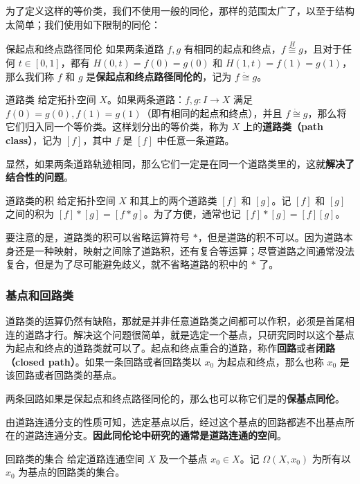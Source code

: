 为了定义这样的等价类，我们不使用一般的同伦，那样的范围太广了，以至于结构太简单；我们使用如下限制的同伦：

\begin{definition}{保起点和终点路径同伦}\label{def_HomT3_2}
如果两条道路 $f, g$ 有相同的起点和终点，$f\overset{H}{\cong}g$，且对于任何 $t\in [0, 1]$，都有 $H(0, t)=f(0)=g(0)$ 和 $H(1, t)=f(1)=g(1)$，那么我们称 $f$ 和 $g$ 是\textbf{保起点和终点路径同伦的}，记为 $f\dot{\cong}g$。
\end{definition}

\begin{definition}{道路类}
给定拓扑空间 $X$。如果两条道路：$f, g:I\rightarrow X$ 满足 $f(0)=g(0), f(1)=g(1)$（即有相同的起点和终点），并且 $f\dot{\cong}g$，那么将它们归入同一个等价类。这样划分出的等价类，称为 $X$ 上的\textbf{道路类（path class）}，记为 $[f]$，其中 $f$ 是 $[f]$ 中任意一条道路。
\end{definition}

显然，如果两条道路轨迹相同，那么它们一定是在同一个道路类里的，这就\textbf{解决了结合性的问题}。

\begin{definition}{道路类的积}
给定拓扑空间 $X$ 和其上的两个道路类 $[f]$ 和 $[g]$。记 $[f]$ 和 $[g]$ 之间的积为 $[f]*[g]=[f*g]$。为了方便，通常也记 $[f]*[g]=[f][g]$。
\end{definition}

要注意的是，道路类的积可以省略运算符号 $*$，但是道路的积不可以。因为道路本身还是一种映射，映射之间除了道路积，还有复合等运算；尽管道路之间通常没法复合，但是为了尽可能避免歧义，就不省略道路的积中的 $*$ 了。

\subsubsection{基点和回路类}

道路类的运算仍然有缺陷，那就是并非任意道路类之间都可以作积，必须是首尾相连的道路才行。解决这个问题很简单，就是选定一个基点，只研究同时以这个基点为起点和终点的道路类就可以了。起点和终点重合的道路，称作\textbf{回路}或者\textbf{闭路（closed path）}。如果一条回路或者回路类以 $x_0$ 为起点和终点，那么也称 $x_0$ 是该回路或者回路类的基点。

两条回路如果是保起点和终点路径同伦的，那么也可以称它们是的\textbf{保基点同伦}。

由道路连通分支的性质可知，选定基点以后，经过这个基点的回路都逃不出基点所在的道路连通分支。\textbf{因此同伦论中研究的通常是道路连通的空间}。

\begin{definition}{回路类的集合}
给定道路连通空间 $X$ 及一个基点 $x_0\in X$。记 $\Omega(X, x_0)$ 为所有以 $x_0$ 为基点的回路类的集合。
\end{definition}

